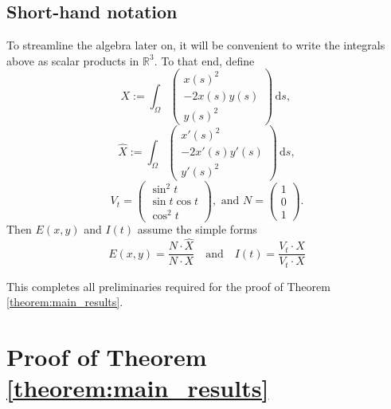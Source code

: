\documentclass{article}
\newcommand{\ds}{\,\mathrm{d}s}
\newcommand{\R}{\mathbb{R}\xspace}
\begin{document}
\subsection{Short-hand notation}

To streamline the algebra later on, it will be convenient to write the integrals above as scalar products in $\R^3$. To that end, define
\begin{equation}
    X := \int_\Omega
    \begin{pmatrix}
        x(s)^2\\
        -2x(s)y(s)\\
        y(s)^2
    \end{pmatrix}
    \ds,\, 
\end{equation}
\begin{equation}
    \hat X := \int_\Omega
    \begin{pmatrix}
        x'(s)^2\\
        -2x'(s)y'(s)\\
        y'(s)^2
    \end{pmatrix}
    \ds,
\end{equation}
\begin{equation} \label{eq:def_Vt_and_N}
    V_t= 
    \begin{pmatrix}
        \sin^2 t \\
        \sin t\cos t\\
        \cos^2 t
    \end{pmatrix}
    ,\text{ and }
    N = 
    \begin{pmatrix}
        1 \\
        0 \\
        1
    \end{pmatrix}.
\end{equation}
Then $E(x,y)$ and $I(t)$ assume the simple forms 
\begin{equation} \label{eq:NX_and_VX}
    E(x,y) = \frac{N \cdot \hat X}{N \cdot X} \quad \text{and} \quad I(t) = \frac{V_t \cdot \hat X}{V_t \cdot X}
\end{equation}

This completes all preliminaries required for the proof of Theorem \ref{theorem:main_results}.

\section{Proof of Theorem \ref{theorem:main_results}}  \label{sec:Proof}
\end{document}
